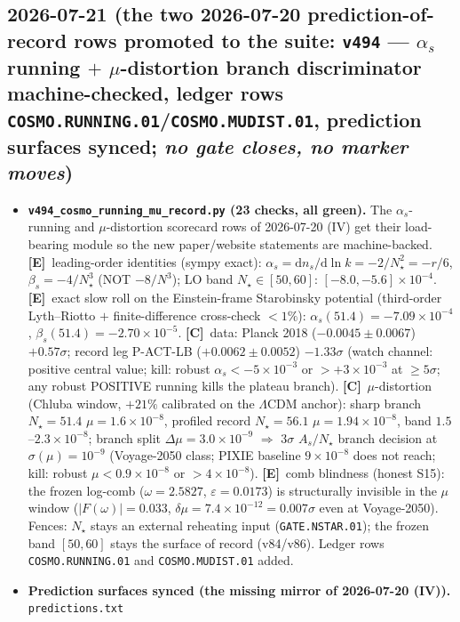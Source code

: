 \documentclass[11pt]{article}
\providecommand{\mE}{\textbf{[E]}}\providecommand{\mC}{\textbf{[C]}}
\begin{document}
\subsection*{2026-07-21 (the two 2026-07-20 prediction-of-record rows promoted to the suite: \texttt{v494} --- $\alpha_s$ running $+$ $\mu$-distortion branch discriminator machine-checked, ledger rows \texttt{COSMO.RUNNING.01}/\texttt{COSMO.MUDIST.01}, prediction surfaces synced; \emph{no gate closes, no marker moves})}
\begin{itemize}[leftmargin=1.5em]
\item \textbf{\texttt{v494\_cosmo\_running\_mu\_record.py} (23 checks, all green).} The $\alpha_s$-running and
$\mu$-distortion scorecard rows of 2026-07-20 (IV) get their load-bearing module so the new paper/website
statements are machine-backed. \mE\ leading-order identities (sympy exact):
$\alpha_s=\mathrm dn_s/\mathrm d\ln k=-2/N_\star^2=-r/6$, $\beta_s=-4/N_\star^3$ (NOT $-8/N^3$); LO band
$N_\star\in[50,60]$: $[-8.0,-5.6]\times10^{-4}$. \mE\ exact slow roll on the Einstein-frame Starobinsky
potential (third-order Lyth--Riotto $+$ finite-difference cross-check $<1\%$):
$\alpha_s(51.4)=-7.09\times10^{-4}$, $\beta_s(51.4)=-2.70\times10^{-5}$. \mC\ data: Planck 2018
($-0.0045\pm0.0067$) $+0.57\sigma$; record leg P-ACT-LB ($+0.0062\pm0.0052$) $-1.33\sigma$ (watch channel:
positive central value; kill: robust $\alpha_s<-5\times10^{-3}$ or $>+3\times10^{-3}$ at $\ge5\sigma$; any
robust POSITIVE running kills the plateau branch). \mC\ $\mu$-distortion (Chluba window, $+21\%$ calibrated
on the $\Lambda$CDM anchor): sharp branch $N_\star{=}51.4$ $\mu=1.6\times10^{-8}$, profiled record
$N_\star{=}56.1$ $\mu=1.94\times10^{-8}$, band $1.5$--$2.3\times10^{-8}$; branch split
$\Delta\mu=3.0\times10^{-9}$ $\Rightarrow$ $3\sigma$ $A_s/N_\star$ branch decision at
$\sigma(\mu)=10^{-9}$ (Voyage-2050 class; PIXIE baseline $9\times10^{-8}$ does not reach; kill: robust
$\mu<0.9\times10^{-8}$ or $>4\times10^{-8}$). \mE\ comb blindness (honest S15): the frozen log-comb
($\omega=2.5827$, $\varepsilon=0.0173$) is structurally invisible in the $\mu$ window
($|F(\omega)|=0.033$, $\delta\mu=7.4\times10^{-12}=0.007\sigma$ even at Voyage-2050). Fences: $N_\star$
stays an external reheating input (\texttt{GATE.NSTAR.01}); the frozen band $[50,60]$ stays the surface of
record (v84/v86). Ledger rows \texttt{COSMO.RUNNING.01} and \texttt{COSMO.MUDIST.01} added.
\item \textbf{Prediction surfaces synced (the missing mirror of 2026-07-20 (IV)).} \texttt{predictions.txt}

\end{itemize}
\end{document}
